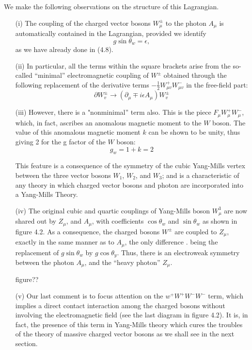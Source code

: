 We make the following observations on the structure of this Lagrangian. 
\begin{itemize}
\item[(i)] The coupling of the charged vector bosons $W^{\pm}_{\mu}$ to the photon $A_{\mu}$ is automatically contained in the Lagrangian, provided we identify 
$$
g \sin \theta_{w} = \epsilon,
$$
as we have already done in (4.8). 

\item[(ii)] In particular, all the terms within the square brackets arise from the so-called “minimal” electromagnetic coupling of $W^{\pm}$ obtained through the following replacement of the derivative terms $-\frac{1}{2}W^{+}_{\mu v}W^{-}_{\mu v}$ in the free-field part: 
$$
\partial W^{\pm}_{v}\rightarrow (\partial_{\mu} \mp i \epsilon A_{\mu})W^{\pm}_{v}
$$

\item[(iii)] However, there is a "nonminimal” term also. This is the piece $F_{\mu}W^{+}_{\mu}W^{-}_{\mu}$, which, in fact,
ascribes an anomalous magnetic moment to the $W$ boson. The value of this anomalous magnetic
moment $k$ can be shown to be unity, thus giving 2 for the g factor of the $W$ boson: 
\begin{equation*}
g_{w} = 1+k =2\tag{4.19}
\end{equation*}

This feature is a consequence of the symmetry of the cubic Yang-Mills vertex between the
three vector bosons $W_{1}$, $W_{2}$, and $W_{3}$; and is a characteristic of any theory in which charged
vector bosons and photon are incorporated into a Yang-Mills Theory. 

\item[(iv)] The original cubic and quartic couplings of Yang-Mills boson $W^{3}_{\mu}$ are now shared out by $Z_{\mu}$,
and $A_{\mu}$, with coefficients $\cos \theta_{w}$ and $\sin \theta_{w}$ as shown in figure 4.2. As a consequence, the
charged bosons $W^{\pm}$ are coupled to $Z_{\mu}$, exactly in the same manner as to $A_{\mu}$, the only difference .
being the replacement of $g \sin \theta_{w}$ by $g \cos \theta_{y}$. Thus, there is an electroweak symmetry between
the photon $A_{\mu}$, and the “heavy photon” $Z_{\mu}$. 

figure??


\item[(v)] Our last comment is to focus attention on the $w^{+} W^{+}W^{-}W^{-}$ term, which implies a direct
contact interaction among the charged bosons without involving the electromagnetic field (see
the last diagram in figure 4.2). It is, in fact, the presence of this term in Yang-Mills theory
which cures the troubles of the theory of massive charged vector bosons as we shall see in
the next section. 
\end{itemize}

